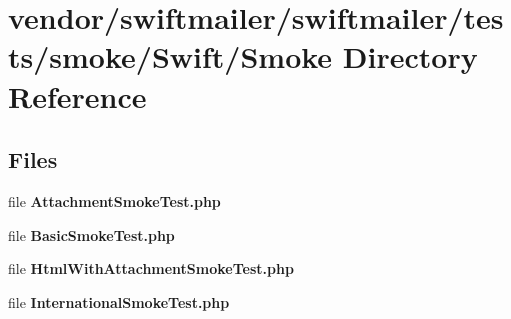 \section{vendor/swiftmailer/swiftmailer/tests/smoke/\+Swift/\+Smoke Directory Reference}
\label{dir_79bb74e2ba89dcccae6feb005da3c12b}
\subsection*{Files}
\begin{DoxyCompactItemize}
\item 
file {\bf Attachment\+Smoke\+Test.\+php}
\item 
file {\bf Basic\+Smoke\+Test.\+php}
\item 
file {\bf Html\+With\+Attachment\+Smoke\+Test.\+php}
\item 
file {\bf International\+Smoke\+Test.\+php}
\end{DoxyCompactItemize}
